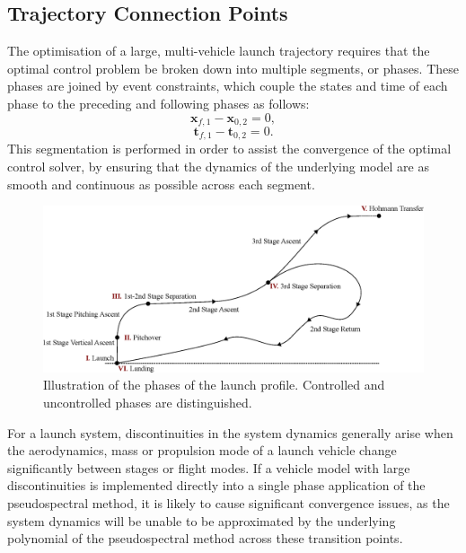 \subsection{Trajectory Connection Points}
The optimisation of a large, multi-vehicle launch trajectory requires that the optimal control problem be broken down into multiple segments, or phases\cite{Patterson2015}.
 These phases are joined by event constraints, which couple the states and time of each phase to the preceding and following phases as follows:
 \begin{equation}\label{eq:cont1}
 \textbf{x}_{f,1} - \textbf{x}_{0,2} = 0,
 \end{equation}
 \begin{equation}\label{eq:cont2}
 \textbf{t}_{f,1} - \textbf{t}_{0,2} = 0.
 \end{equation}
 This segmentation is performed in order to assist the convergence of the optimal control solver, by ensuring that the dynamics of the underlying model are as smooth and continuous as possible across each segment. 
  \begin{figure}[ht]
  	\centering
  	\includegraphics[width=1.\linewidth]{figures/4_LODESTAR/Traj}
  	\caption{Illustration of the phases of the launch profile. Controlled and uncontrolled phases are distinguished. }
  	\label{fig:Traj}
  \end{figure}
  
For a launch system, discontinuities in the system dynamics generally arise when the aerodynamics, mass or propulsion mode of a launch vehicle change significantly between stages or flight modes. 
If a vehicle model with large discontinuities is implemented directly into a single phase application of the pseudospectral method, it is likely to cause significant convergence issues, as the system dynamics will be unable to be approximated by the underlying polynomial of the pseudospectral method across these transition points\cite{Betts2009}.

